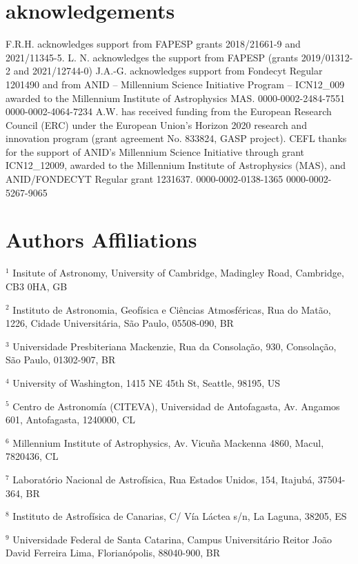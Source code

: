 \section*{aknowledgements}
F.R.H. acknowledges support from FAPESP grants 2018/21661-9 and 2021/11345-5.
L. N. acknowledges the support from FAPESP (grants 2019/01312-2 and 2021/12744-0)
J.A.-G. acknowledges support from Fondecyt Regular 1201490 and from ANID – Millennium Science Initiative Program – ICN12_009 awarded to the Millennium Institute of Astrophysics MAS.
0000-0002-2484-7551
0000-0002-4064-7234
A.W. has received funding from the European Research Council (ERC) under the European Union’s Horizon 2020 research and innovation program (grant agreement No. 833824, GASP project).
CEFL thanks for the support of ANID's Millennium Science Initiative through grant ICN12_12009, awarded to the Millennium Institute of Astrophysics (MAS), and ANID/FONDECYT Regular grant 1231637.
0000-0002-0138-1365
0000-0002-5267-9065


\section{Authors Affiliations}\label{ap:affiliations}

\noindent
$^{1}$ Insitute of Astronomy, University of Cambridge, Madingley Road, Cambridge, CB3 0HA, GB

\noindent
$^{2}$ Instituto de Astronomia, Geofísica e Ciências Atmosféricas, Rua do Matão, 1226, Cidade Universitária, São Paulo, 05508-090, BR

\noindent
$^{3}$ Universidade Presbiteriana Mackenzie, Rua da Consolação, 930, Consolação, São Paulo, 01302-907, BR

\noindent
$^{4}$ University of Washington, 1415 NE 45th St, Seattle, 98195, US

\noindent
$^{5}$ Centro de Astronomía (CITEVA), Universidad de Antofagasta, Av. Angamos 601, Antofagasta, 1240000, CL

\noindent
$^{6}$ Millennium Institute of Astrophysics, Av. Vicuña Mackenna 4860, Macul, 7820436, CL

\noindent
$^{7}$ Laboratório Nacional de Astrofísica, Rua Estados Unidos, 154, Itajubá, 37504-364, BR

\noindent
$^{8}$ Instituto de Astrofísica de Canarias, C/ Vía Láctea s/n, La Laguna, 38205, ES

\noindent
$^{9}$ Universidade Federal de Santa Catarina, Campus Universitário Reitor João David Ferreira Lima, Florianópolis, 88040-900, BR

